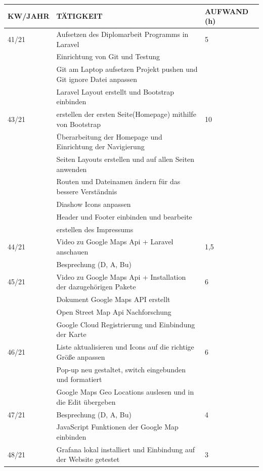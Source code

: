 \newpage
\begin{table}[h]
		\begin{tabular}{|l|l|l|}
		\hline
		\textbf{KW/JAHR} &     \textbf{TÄTIGKEIT}  & 	\textbf{AUFWAND (h)}    \\ \hline
		
	41/21 	& Aufsetzen des Diplomarbeit Programms in Laravel & 5 \\
			& Einrichtung von Git und Testung & \\
			& Git am Laptop aufsetzen Projekt pushen und Git ignore Datei anpassen & \\
			&  Laravel Layout erstellt und Bootstrap einbinden & \\ \hline
	43/21  	& erstellen der ersten Seite(Homepage) mithilfe von Bootstrap & 10\\
			& Überarbeitung der Homepage und Einrichtung der Navigierung  &\\
			& Seiten Layouts erstellen und auf allen Seiten anwenden &\\
			& Routen und Dateinamen ändern für das bessere Verständnis &\\
			& Diashow Icons anpassen &\\
			& Header  und Footer  einbinden und bearbeite &\\
			&erstellen des Impressums &\\ \hline
	44/21  	& Video zu Google Maps Api + Laravel anschauen & 1,5 \\
			& Besprechung (D, A, Bu) & \\ \hline
	45/21   &Video zu Google Maps Api + Installation der dazugehörigen Pakete & 6\\
			&Dokument Google Maps API erstellt& \\
			&Open Street Map Api Nachforschung&\\
			&Google Cloud Registrierung und Einbindung der Karte&\\ \hline
	46/21   &Liste aktualisieren und Icons auf die richtige Größe anpassen & 6\\
			&Pop-up neu gestaltet, switch eingebunden und formatiert &\\
			&Google Maps Geo Locations auslesen und in die Edit übergeben&\\ \hline
	47/21   & Besprechung (D, A, Bu)& 4\\
			&JavaScript Funktionen der Google Map einbinden&\\ \hline
	48/21	&Grafana lokal installiert und Einbindung auf der Website getestet& 3\\ \hline

\end{tabular}
\end{table}
